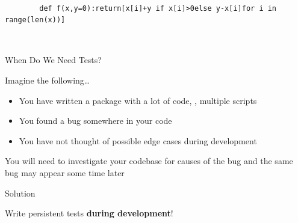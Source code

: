 
\begin{darkframe}
  \begin{center}
    \\[1.5em]
    \begin{minipage}{0.8\textwidth}
      \begin{verbatim}
        def f(x,y=0):return[x[i]+y if x[i]>0else y-x[i]for i in range(len(x))]
      \end{verbatim}
    \end{minipage}
    \\[3em]
  \end{center}

\end{darkframe}



\begin{frame}{When Do We Need Tests?}
  \begin{center}
    \huge\textcolor{ccyan!90!cblack}{Imagine the following\dots}
  \end{center}
  \begin{itemize}
    \item You have written a package with a lot of code, \eg, multiple scripts
    \item You found a bug somewhere in your code
    \item You have not thought of possible edge cases during development
  \end{itemize}
  \vspace{1em}
  \begin{center}
    \huge\textcolor{cpink!90!cblack}{\to{} You will need to investigate your codebase for
    causes of the bug and the same bug may appear some time later}
  \end{center}
\end{frame}

\begin{frame}{Solution}
  \begin{center}
    \huge\textcolor{ccyan!90!cblack}{Write persistent tests \textbf{during development}!}\\
  \end{center}
\end{frame}

